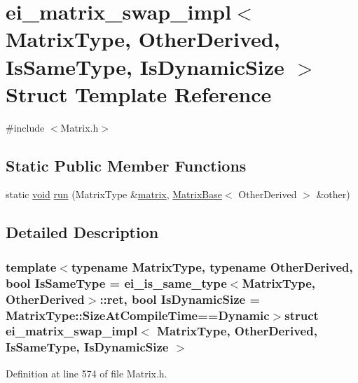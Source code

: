 \hypertarget{structei__matrix__swap__impl}{\section{ei\-\_\-matrix\-\_\-swap\-\_\-impl$<$ Matrix\-Type, Other\-Derived, Is\-Same\-Type, Is\-Dynamic\-Size $>$ Struct Template Reference}
\label{structei__matrix__swap__impl}
}


{\ttfamily \#include $<$Matrix.\-h$>$}

\subsection*{Static Public Member Functions}
\begin{DoxyCompactItemize}
\item 
static \hyperlink{group___u_a_v_objects_plugin_ga444cf2ff3f0ecbe028adce838d373f5c}{void} \hyperlink{structei__matrix__swap__impl_a13c31eac5b856829637b11bf55ff5590}{run} (Matrix\-Type \&\hyperlink{glext_8h_a7b24a3f2f56eb1244ae69dacb4fecb6f}{matrix}, \hyperlink{class_matrix_base}{Matrix\-Base}$<$ Other\-Derived $>$ \&other)
\end{DoxyCompactItemize}


\subsection{Detailed Description}
\subsubsection*{template$<$typename Matrix\-Type, typename Other\-Derived, bool Is\-Same\-Type = ei\-\_\-is\-\_\-same\-\_\-type$<$\-Matrix\-Type, Other\-Derived$>$\-::ret, bool Is\-Dynamic\-Size = Matrix\-Type\-::\-Size\-At\-Compile\-Time==\-Dynamic$>$struct ei\-\_\-matrix\-\_\-swap\-\_\-impl$<$ Matrix\-Type, Other\-Derived, Is\-Same\-Type, Is\-Dynamic\-Size $>$}



Definition at line 574 of file Matrix.\-h.



